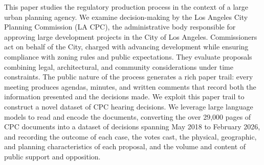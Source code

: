 This paper studies the regulatory production process in the context of a large urban planning agency. We examine decision-making by the Los Angeles City Planning Commission (LA CPC), the administrative body responsible for approving large development projects in the City of Los Angeles. Commissioners act on behalf of the City, charged with advancing development while ensuring compliance with zoning rules and public expectations. They evaluate proposals combining legal, architectural, and community considerations under time constraints. The public nature of the process generates a rich paper trail: every meeting produces agendas, minutes, and written comments that record both the information presented and the decisions made. 
We exploit this paper trail to construct a novel dataset of CPC hearing decisions. We leverage large language models to read and encode the documents, converting the over 29,000 pages of CPC documents into a dataset of  decisions spanning May 2018 to February 2026, and recording the outcome of each case, the votes cast, the physical, geographic, and planning characteristics of each proposal, and the volume and content of public support and opposition.




